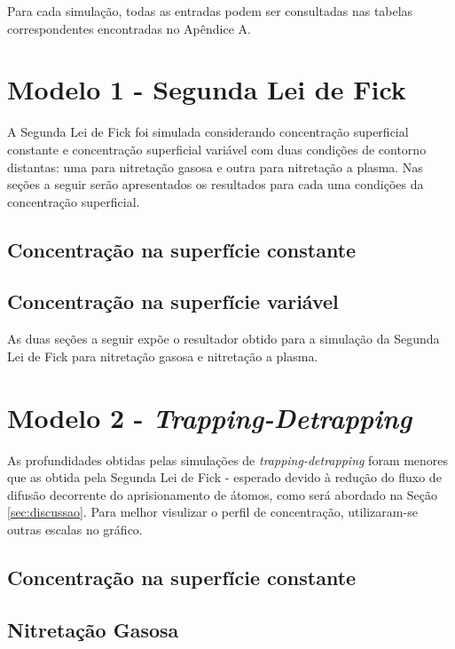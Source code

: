 \documentclass[]{politex}
\begin{document}
	Para cada simulação, todas as entradas podem ser consultadas nas tabelas correspondentes encontradas no Apêndice A.

\section{Modelo 1 - Segunda Lei de Fick}

A Segunda Lei de Fick foi simulada considerando concentração superficial constante e concentração superficial variável com duas condições de contorno distantas: uma para nitretação gasosa e outra para nitretação a plasma.
Nas seções a seguir serão apresentados os resultados para cada uma condições da concentração superficial.

\subsection{Concentração na superfície constante}
\label{sec:modelo11}


\subsection{Concentração na superfície variável}
As duas seções a seguir expõe o resultador obtido para a simulação da Segunda Lei de Fick para nitretação gasosa e nitretação a plasma.

\label{sec:modelo12}


\section{Modelo 2 - \textit{Trapping-Detrapping}}
\label{sec:modelo2}
As profundidades obtidas pelas simulações de \textit{trapping-detrapping} foram menores que as obtida pela Segunda Lei de Fick - esperado devido à redução do fluxo de difusão decorrente do aprisionamento de átomos, como será abordado na Seção \ref{sec:discussao}. Para melhor visulizar o perfil de concentração, utilizaram-se outras escalas no gráfico. 

\subsection{Concentração na superfície constante}
\label{sec:modelo21}


\subsection{Nitretação Gasosa}
\label{sec:modelo22}

\end{document}
